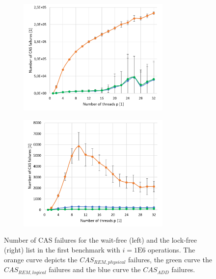 \documentclass[a4paper, 12pt]{article}
\begin{document}
\begin{figure} [h!]
\begin{subfigure}[c]{0.45\textwidth}
\includegraphics[width=7.5cm]{cas_vs_p_wf.png}
\centering
\end{subfigure}
\begin{subfigure}[c]{0.45\textwidth}
\includegraphics[width=7.5cm]{cas_vs_p_lf.png}
\centering
\end{subfigure}
\caption{Number of CAS failures for the wait-free (left) and the lock-free (right) list in the first benchmark with $i = 1\mathrm{E}6$ operations. The orange curve depicts the $CAS_{REM, physical}$ failures, the green curve the $CAS_{REM, logical}$ failures and the blue curve the $CAS_{ADD}$ failures.}
\label{cas_p}
\end{figure}
\end{document}
